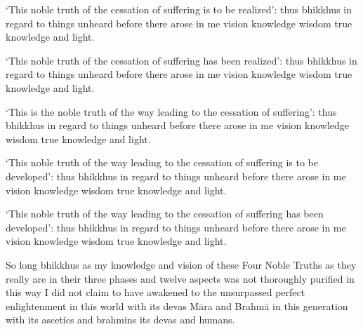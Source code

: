 \medskip

\begin{english-hang}
  `This noble truth of the cessation of suffering is to be realized': thus bhikkhus in regard to things unheard before there arose in me vision knowledge wisdom true knowledge and light.
\end{english-hang}

\medskip

\begin{english-hang}
  `This noble truth of the cessation of suffering has been realized': thus bhikkhus in regard to things unheard before there arose in me vision knowledge wisdom true knowledge and light.
\end{english-hang}

\medskip

\begin{english-hang}
  `This is the noble truth of the way leading to the cessation of suffering': thus bhikkhus in regard to things unheard before there arose in me vision knowledge wisdom true knowledge and light.
\end{english-hang}

\medskip

\begin{english-hang}
  `This noble truth of the way leading to the cessation of suffering is to be developed': thus bhikkhus in regard to things unheard before there arose in me vision knowledge wisdom true knowledge and light.
\end{english-hang}

\medskip

\begin{english-hang}
  `This noble truth of the way leading to the cessation of suffering has been developed': thus bhikkhus in regard to things unheard before there arose in me vision knowledge wisdom true knowledge and light.
\end{english-hang}

\medskip

\begin{english-hang}
  So long bhikkhus as my knowledge and vision of these Four Noble Truths as they really are in their three phases and twelve aspects was not thoroughly purified in this way I did not claim to have awakened to the unsurpassed perfect enlightenment in this world with its devas Māra and Brahmā in this generation with its ascetics and brahmins its devas and humans.
\end{english-hang}


